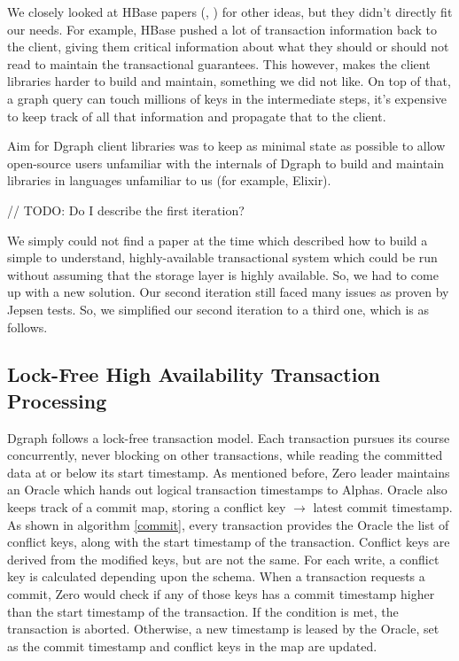 \documentclass[letterpaper,twocolumn,10pt]{article}
\begin{document}
We closely looked at HBase papers (\cite{omid1}, \cite{omid2}) for other ideas,
but they didn't directly fit our needs. For example, HBase pushed a lot of
transaction information back to the client, giving them critical information
about what they should or should not read to maintain the transactional
guarantees. This however, makes the client libraries harder to build and
maintain, something we did not like. On top of that, a graph query can touch
millions of keys in the intermediate steps, it's expensive to keep track of all
that information and propagate that to the client.

Aim for Dgraph client libraries was to keep as minimal state as possible to
allow open-source users unfamiliar with the internals of Dgraph to build
and maintain libraries in languages unfamiliar to us (for example, Elixir).

// TODO: Do I describe the first iteration?

We simply could not find a paper at the time which described how to build a
simple to understand, highly-available transactional system which could be run
without assuming that the storage layer is highly available. So, we had to come
up with a new solution. Our second iteration still faced many issues as proven by
Jepsen tests. So, we simplified our second iteration to a third one, which is as
follows.

\subsection{Lock-Free High Availability Transaction Processing}

Dgraph follows a lock-free transaction model. Each transaction pursues its
course concurrently, never blocking on other transactions, while reading the
committed data at or below its start timestamp. As mentioned before, Zero leader
maintains an Oracle which hands out logical transaction timestamps to Alphas.
Oracle also keeps track of a commit map, storing a conflict key $\rightarrow$ latest commit
timestamp. As shown in algorithm \ref{commit}, every transaction provides the
Oracle the list of conflict keys, along with the start timestamp of the
transaction. Conflict keys are derived from the modified keys, but are not the
same. For each write, a conflict key is calculated depending upon the schema.
When a transaction requests a commit, Zero would check if any of those keys has
a commit timestamp higher than the start timestamp of the transaction. If the
condition is met, the transaction is aborted. Otherwise, a new timestamp is
leased by the Oracle, set as the commit timestamp and conflict keys in the map
are updated.
\end{document}
